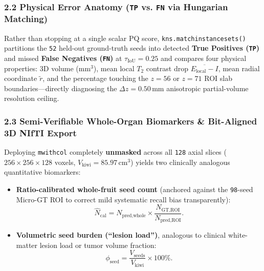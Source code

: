 \documentclass[10pt,a4paper]{article}
\renewcommand{\_}{\origunderscore\allowbreak}
\begin{document}
\subsubsection*{2.2 Physical Error Anatomy (\texttt{TP} vs. \texttt{FN} via Hungarian Matching)}
Rather than stopping at a single scalar $\text{PQ}$ score, \texttt{kns.match\_instance\_sets()} partitions the \texttt{52} held-out ground-truth seeds into detected \textbf{True Positives (\texttt{TP})} and missed \textbf{False Negatives (\texttt{FN})} at $\tau_{\text{IoU}} = 0.25$ and compares four physical properties: 3D volume ($\text{mm}^3$), mean local $T_2$ contrast drop $\overline{E_{\text{local}} - I}$, mean radial coordinate $\tilde{r}$, and the percentage touching the $z = 56$ or $z = 71$ ROI slab boundaries---directly diagnosing the $\Delta z = 0.50\,\text{mm}$ anisotropic partial-volume resolution ceiling.

\subsubsection*{2.3 Semi-Verifiable Whole-Organ Biomarkers \& Bit-Aligned 3D NIfTI Export}
Deploying \texttt{m\_with\_col} completely \textbf{unmasked} across all \texttt{128} axial slices ($256 \times 256 \times 128$ voxels, $V_{\text{kiwi}} = 85.97\,\text{cm}^3$) yields two clinically analogous quantitative biomarkers:
\begin{itemize}
\item \textbf{Ratio-calibrated whole-fruit seed count} (anchored against the \texttt{98}-seed Micro-GT ROI to correct mild systematic recall bias transparently):
\[
\hat{N}_{\text{cal}} = N_{\text{pred,whole}} \times \frac{N_{\text{GT,ROI}}}{N_{\text{pred,ROI}}}.
\]
\item \textbf{Volumetric seed burden (``lesion load'')}, analogous to clinical white-matter lesion load or tumor volume fraction:
\[
\phi_{\text{seed}} = \frac{V_{\text{seeds}}}{V_{\text{kiwi}}} \times 100\%.
\]
\end{itemize}
\end{document}
